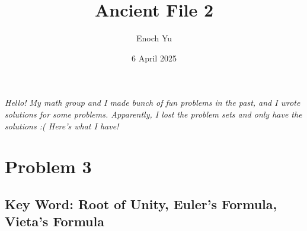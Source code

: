 \documentclass[12pt]{report}
\title{Ancient File 2}
\author{Enoch Yu}
\date{6 April 2025}
\begin{document}
\maketitle

\begin{center}
\small\em
Hello! My math group and I made bunch of fun problems
in the past, and I wrote solutions for some problems.
Apparently, I lost the problem sets and only have the
solutions :( Here's what I have!
\end{center}

\chapter*{Problem 3}
\section*{Key Word: Root of Unity, Euler's Formula, Vieta's Formula}
\end{document}
